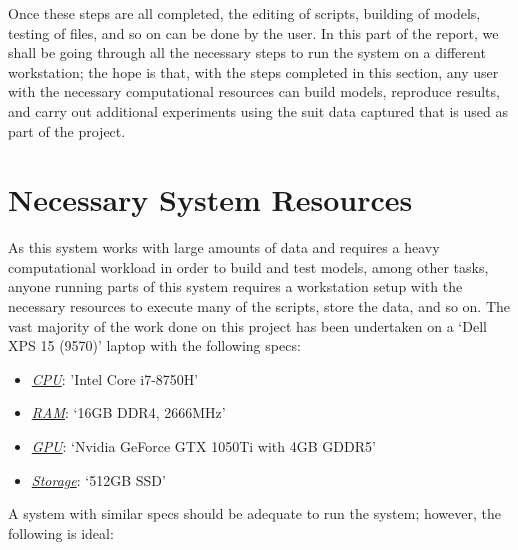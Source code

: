 \documentclass[12pt,twoside]{report}
\begin{document}
\quad Once these steps are all completed, the editing of scripts, building of models, testing of files, and so on can be done by the user. In this part of the report, we shall be going through all the necessary steps to run the system on a different workstation; the hope is that, with the steps completed in this section, any user with the necessary computational resources can build models, reproduce results, and carry out additional experiments using the suit data captured that is used as part of the project.

\section{Necessary System Resources}

\quad As this system works with large amounts of data and requires a heavy computational workload in order to build and test models, among other tasks, anyone running parts of this system requires a workstation setup with the necessary resources to execute many of the scripts, store the data, and so on. The vast majority of the work done on this project has been undertaken on a ‘Dell XPS 15 (9570)’ laptop with the following specs:

\begin{itemize}
	\item \underline{\textit{CPU}}: 'Intel Core i7-8750H’
	\item \underline{\textit{RAM}}: ‘16GB DDR4, 2666MHz’
	\item \underline{\textit{GPU}}: ‘Nvidia GeForce GTX 1050Ti with 4GB GDDR5’
	\item \underline{\textit{Storage}}: ‘512GB SSD’
\end{itemize}

A system with similar specs should be adequate to run the system; however, the following is ideal:
\end{document}
